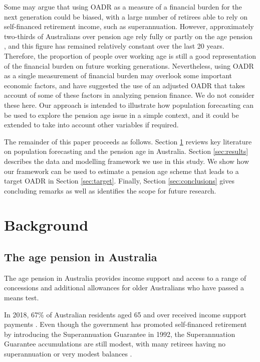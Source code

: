 \documentclass[
  doublespace]{anzsauth}
\begin{document}
Some may argue that using OADR as a measure of a financial burden for the next generation could be biased, with a large number of retirees able to rely on self-financed retirement income, such as superannuation. However, approximately two-thirds of Australians over pension age rely fully or partly on the age pension \citep{AIHW19}, and this figure has remained relatively constant over the last 20 years. Therefore, the proportion of people over working age is still a good representation of the financial burden on future working generations. Nevertheless, using OADR as a single measurement of financial burden may overlook some important economic factors, and \citet{HY12} have suggested the use of an adjusted OADR that takes account of some of these factors in analyzing pension finance. We do not consider these here. Our approach is intended to illustrate how population forecasting can be used to explore the pension age issue in a simple context, and it could be extended to take into account other variables if required.

The remainder of this paper proceeds as follows. Section \ref{sec:litreview} reviews key literature on population forecasting and the pension age in Australia. Section \ref{sec:results} describes the data and modelling framework we use in this study. We show how our framework can be used to estimate a pension age scheme that leads to a target OADR in Section \ref{sec:target}. Finally, Section \ref{sec:conclusions} gives concluding remarks as well as identifies the scope for future research.

\hypertarget{sec:litreview}{%
\section{Background}\label{sec:litreview}}

\hypertarget{the-age-pension-in-australia}{%
\subsection{The age pension in Australia}\label{the-age-pension-in-australia}}

The age pension in Australia provides income support and access to a range of concessions and additional allowances for older Australians who have passed a means test.

In 2018, 67\% of Australian residents aged 65 and over received income support payments \citep{AIHW19}. Even though the government has promoted self-financed retirement by introducing the Superannuation Guarantee in 1992, the Superannuation Guarantee accumulations are still modest, with many retirees having no superannuation or very modest balances \citep{data61}.
\end{document}
